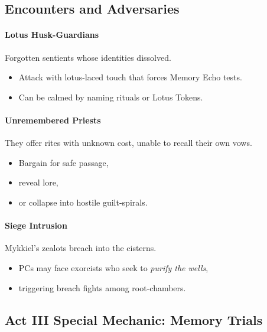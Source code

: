 \documentclass[11pt]{article}
\begin{document}
\subsection*{Encounters and Adversaries}

\paragraph{Lotus Husk-Guardians}
Forgotten sentients whose identities dissolved.

\begin{itemize}[leftmargin=*]
  \item Attack with lotus-laced touch that forces Memory Echo tests.
  \item Can be calmed by naming rituals or Lotus Tokens.
\end{itemize}

\paragraph{Unremembered Priests}
They offer rites with unknown cost, unable to recall their own vows.

\begin{itemize}[leftmargin=*]
  \item Bargain for safe passage,
  \item reveal lore,
  \item or collapse into hostile guilt-spirals.
\end{itemize}

\paragraph{Siege Intrusion}
Mykkiel's zealots breach into the cisterns.

\begin{itemize}[leftmargin=*]
  \item PCs may face exorcists who seek to \emph{purify the wells},
  \item triggering breach fights among root-chambers.
\end{itemize}

\bigskip

\subsection*{Act III Special Mechanic: Memory Trials}
\end{document}
